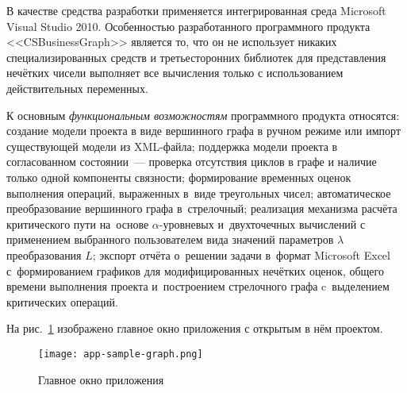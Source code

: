 В качестве средства разработки применяется интегрированная среда Microsoft Visual Studio 2010. Особенностью разработанного программного продукта <<CSBusinessGraph>> является то, что он не использует никаких специализированных средств и третьесторонних библиотек для представления нечётких чисели выполняет все вычисления только с использованием действительных переменных.

К основным \textit{функциональным возможностям} программного продукта относятся: создание модели проекта в виде вершинного графа в ручном режиме или импорт существующей модели из XML-файла; поддержка модели проекта в согласованном состоянии~--- проверка отсутствия циклов в графе и наличие только одной компоненты связности; формирование временных оценок выполнения операций, выраженных в~виде треугольных чисел; автоматическое преобразование вершинного графа в~стрелочный; реализация механизма расчёта критического пути на~основе $\alpha$-уровневых и~двухточечных вычислений с применением выбранного пользователем  вида значений параметров $\lambda$ преобразования $L$; экспорт отчёта о~решении задачи в~формат Microsoft Excel с~формированием графиков для модифицированных нечётких оценок, общего времени выполнения проекта и~построением стрелочного графа c~выделением критических операций.

На рис.~\ref{fig:app-sample-graph} изображено главное окно приложения с открытым в нём проектом.
\begin{figure}[t!] 
  \center
  \texttt{[image: app-sample-graph.png]}
  \caption{Главное окно приложения} 
  \label{fig:app-sample-graph}
\end{figure}
